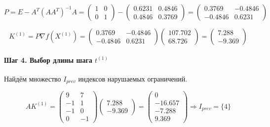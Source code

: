 \begin{equation*}
P = E - A^T \left(A A^T\right)^{-1} A = \begin{pmatrix} 1 & 0 \\ 0 & 1 \end{pmatrix} - \begin{pmatrix} 0.6231 & 0.4846 \\ 0.4846 & 0.3769 \end{pmatrix} = \begin{pmatrix} 0.3769 & -0.4846 \\ -0.4846 & 0.6231 \end{pmatrix}
\end{equation*}

\begin{equation*}
	K^{(1)} = P \nabla f(X^{(1)}) = \begin{pmatrix} 0.3769 & -0.4846 \\ -0.4846 & 0.6231 \end{pmatrix} \begin{pmatrix} 107.702 \\ 68.726 \end{pmatrix} = \begin{pmatrix} 7.288 \\ -9.369 \end{pmatrix}
\end{equation*}

\paragraph{Шаг 4. Выбор длины шага $t^{(1)}$}

Найдём множество $I_{prev}$ индексов нарушаемых ограничений.

\begin{equation*}
	A K^{(1)} = \begin{pmatrix}
		9 & 7
		\\
		-1 & 1
		\\
		-1 & 0
		\\
		0 & -1
	\end{pmatrix}
	\begin{pmatrix} 7.288 \\ -9.369 \end{pmatrix}
	=
	\begin{pmatrix}
		0 \\ -16.657 \\ -7.288 \\ 9.369
	\end{pmatrix}
	\Rightarrow I_{prev} = \{4\}
\end{equation*}

